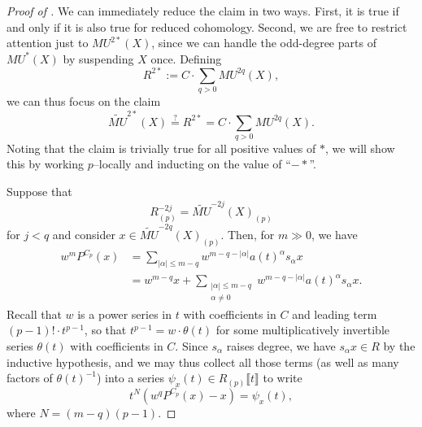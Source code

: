 \begin{proof}[{Proof of }]
We can immediately reduce the claim in two ways.  First, it is true if and only if it is also true for reduced cohomology.  Second, we are free to restrict attention just to \(MU^{2*}(X)\), since we can handle the odd-degree parts of \(MU^*(X)\) by suspending \(X\) once.  Defining \[R^{2*} := C \cdot \sum_{q > 0} MU^{2q}(X),\] we can thus focus on the claim \[\widetilde{MU}^{2*}(X) \stackrel{?}{=} R^{2*} = C \cdot \sum_{q > 0} MU^{2q}(X).\]  Noting that the claim is trivially true for all positive values of \(*\), we will show this by working \(p\)--locally and inducting on the value of ``\(-*\)''.

Suppose that \[R^{-2j}_{(p)} = \widetilde{MU}^{-2j}(X)_{(p)}\] for \(j < q\) and consider \(x \in \widetilde{MU}^{-2q}(X)_{(p)}\).  Then, for \(m \gg 0\), we have
\begin{align*}
w^m P^{C_p}(x) & = \sum_{|\alpha| \le m-q} w^{m-q - |\alpha|} a(t)^\alpha s_\alpha x \\
& = w^{m-q} x + \sum_{\substack{|\alpha| \le m-q \\ \alpha \ne 0}} w^{m-q - |\alpha|} a(t)^\alpha s_\alpha x.
\end{align*}
Recall that \(w\) is a power series in \(t\) with coefficients in \(C\) and leading term \((p-1)! \cdot t^{p-1}\), so that \(t^{p-1} = w \cdot \theta(t)\) for some multiplicatively invertible series \(\theta(t)\) with coefficients in \(C\).  Since \(s_\alpha\) raises degree, we have \(s_\alpha x \in R\) by the inductive hypothesis, and we may thus collect all those terms (as well as many factors of \(\theta(t)^{-1}\)) into a series \(\psi_x(t) \in R_{(p)}\llbracket t \rrbracket\) to write \[t^N(w^q P^{C_p}(x) - x) = \psi_x(t),\] where \(N = (m-q)(p-1)\).


\end{proof}
